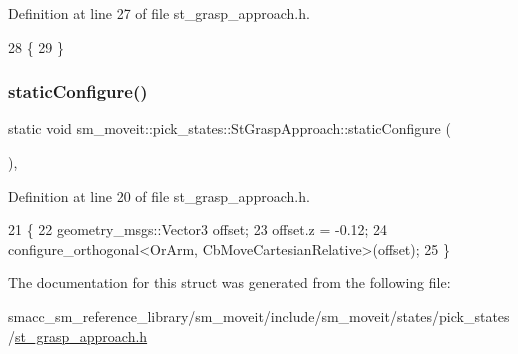 Definition at line 27 of file st\+\_\+grasp\+\_\+approach.\+h.


\begin{DoxyCode}
28     \{
29     \}
\end{DoxyCode}
\mbox{\label{structsm__moveit_1_1pick__states_1_1StGraspApproach_a66e75bd4670e13898394a2b27b771a98}} 
\subsubsection{\texorpdfstring{static\+Configure()}{staticConfigure()}}
{\footnotesize\ttfamily static void sm\+\_\+moveit\+::pick\+\_\+states\+::\+St\+Grasp\+Approach\+::static\+Configure (\begin{DoxyParamCaption}{ }\end{DoxyParamCaption})\hspace{0.3cm}{\ttfamily [inline]}, {\ttfamily [static]}}



Definition at line 20 of file st\+\_\+grasp\+\_\+approach.\+h.


\begin{DoxyCode}
21     \{
22         geometry\_msgs::Vector3 offset;
23         offset.z = -0.12;
24         configure\_orthogonal<OrArm, CbMoveCartesianRelative>(offset);
25     \}
\end{DoxyCode}


The documentation for this struct was generated from the following file\+:\begin{DoxyCompactItemize}
\item 
smacc\+\_\+sm\+\_\+reference\+\_\+library/sm\+\_\+moveit/include/sm\+\_\+moveit/states/pick\+\_\+states/\hyperlink{include_2sm__moveit_2states_2pick__states_2st__grasp__approach_8h}{st\+\_\+grasp\+\_\+approach.\+h}\end{DoxyCompactItemize}
